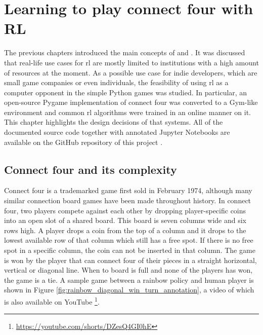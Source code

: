 \chapter{Learning to play connect four with RL}
\label{ch:connect_four_rl}

The previous chapters introduced the main concepts of  and .
It was discussed that real-life use cases for \gls{rl} are mostly limited to institutions with a high amount of resources at the moment.
As a possible use case for indie developers, which are small game companies or even individuals, the feasibility of using \gls{rl} as a computer opponent in the simple Python games was studied.
In particular, an open-source Pygame implementation of connect four was converted to a Gym-like environment and common \gls{rl} algorithms were trained in an online manner on it.
This chapter highlights the design decisions of that systems.
All of the documented source code together with annotated Jupyter Notebooks are available on the GitHub repository of this project \citep{github_project}.


\section{Connect four and its complexity}
\label{sec:connect_four_rl-harder_then_you_think}

Connect four is a trademarked game first sold in February 1974, although many similar connection board games have been made throughout history.
In connect four, two players compete against each other by dropping player-specific coins into an open slot of a shared board.
This board is seven columns wide and six rows high.
A player drops a coin from the top of a column and it drops to the lowest available row of that column which still has a free spot.
If there is no free spot in a specific column, the coin can not be inserted in that column.
The game is won by the player that can connect four of their pieces in a straight horizontal, vertical or diagonal line.
When to board is full and none of the players has won, the game is a tie. 
A sample game between a rainbow policy and human player is shown in Figure \ref{fig:rainbow_diagonal_win_turn_annotation}, a video of which is also available on YouTube \footnote{\url{https://youtube.com/shorts/DZesQ4GI0hE}}.

